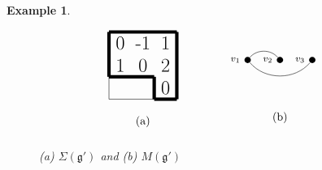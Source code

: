 \documentclass[letterpaper,10pt]{article}
\newtheorem{Ex}[theorem]{Example}
\begin{document}
\begin{Ex}
\begin{figure}[H]
$$\begin{tikzpicture}[scale=0.7]
\draw (0,0) -- (3,0);
\draw (3,0) -- (3,3);
\draw (3,3) -- (0,3);
\draw (0,3) -- (0,0);
\draw [line width=3](2,0) -- (2,1);
\draw [line width=3](2,1) -- (0,1);
\draw [line width=3](0,1) -- (0,3);
\draw [line width=3](0,3) -- (3,3);
\draw [line width=3](3,3) -- (3,0);
\draw [line width=3](3,0) -- (2,0);
\node at (2.5,0.5) {\LARGE{0}};
\node at (0.5,1.5) {\LARGE{1}};
\node at (1.5,1.5) {\LARGE{0}};
\node at (2.5,1.5) {\LARGE{2}};
\node at (0.5,2.5) {\LARGE{0}};
\node at (1.5,2.5) {\LARGE{-1}};
\node at (2.5,2.5) {\LARGE{1}};
\node at (1.5, -1) {(a)};

\end{tikzpicture}\hspace{1.5cm}\begin{tikzpicture}
	\def\Node{\node [circle,  fill, inner sep=2pt]}
	\tikzset{->-/.style={decoration={
  markings,
  mark=at position .55 with {\arrow{>}}},postaction={decorate}}}
	\node at (0,-0.3) {};
    \Node[label=left:\footnotesize {$v_1$}] (1) at (0,1.8) {};
	\Node[label=left:\footnotesize {$v_2$}] (2) at (1,1.8) {};
    \Node[label=left:\footnotesize {$v_3$}] (3) at (2,1.8) {};
	\draw (1) to[bend right=50] (3);
    \draw (2) to[bend right=50] (1);
    \node at (1, 0) {(b)};
\end{tikzpicture}$$
\caption{(a) $\Sigma(\mathfrak{g}')$ and (b) $M(\mathfrak{g}')$}\label{fig:trb6}
\end{figure}
\end{Ex}
\end{document}
